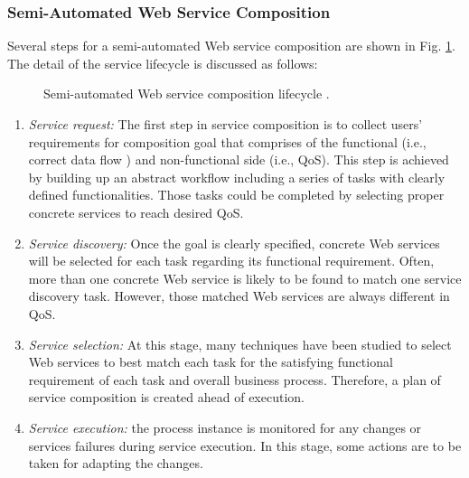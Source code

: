 \subsubsection{Semi-Automated Web Service Composition}\label{lifecycle}
Several steps for a semi-automated Web service composition are shown in Fig. \ref{fig:lifecycle}. The detail of the service lifecycle is discussed as follows:

\begin{figure}
\centerline{
}
\caption{Semi-automated Web service composition lifecycle \cite{moghaddam2014service}.}
\label{fig:lifecycle}
\end{figure}

\begin{enumerate}
 \item \textit{Service request:} The first step in service composition is to collect users' requirements for composition goal that comprises of the functional (i.e., correct data flow ) and non-functional side (i.e., QoS). This step is achieved by building up an abstract workflow including a series of tasks with clearly defined functionalities. Those tasks could be completed by selecting proper concrete services to reach desired QoS. 
 \item \textit{Service discovery:} Once the goal is clearly specified, concrete Web services will be selected for each task regarding its functional requirement. Often, more than one concrete Web service is likely to be found to match one service discovery task. However, those matched Web services are always different in QoS.
 \item \textit{Service selection:} At this stage, many techniques have been studied to select Web services to best match each task for the satisfying functional requirement of each task and overall business process. Therefore, a plan of service composition is created ahead of execution.
 \item \textit{Service execution:} the process instance is monitored for any changes or services failures during service execution. In this stage, some actions are to be taken for adapting the changes.
\end{enumerate}

